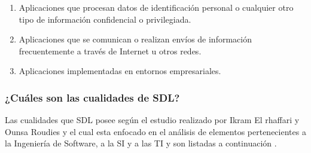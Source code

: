 \documentclass[runningheads,a4paper]{llncs}
\begin{document}
\begin{enumerate}
	\item Aplicaciones que procesan datos de identificación personal o cualquier otro  tipo de información confidencial o privilegiada. 
	\item Aplicaciones que se comunican o realizan envíos de información frecuentemente a través de Internet u otros redes. 
	\item Aplicaciones implementadas en entornos empresariales.
\end{enumerate}

\subsubsection{¿Cuáles son las cualidades de \gls{SDL}?}
Las cualidades que \gls{SDL} posee según el estudio realizado por Ikram El rhaffari y Ounsa Roudies y el cual esta enfocado en el análisis de elementos pertenecientes a la Ingeniería de \gls{Software}, a la \gls{SI} y a las \gls{TI} y son listadas a continuación \cite{BenchmarkingSDLCLAPS}. 
\end{document}
